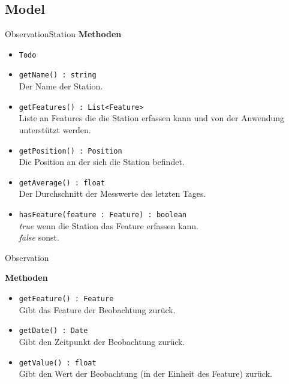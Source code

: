 \subsection{Model}

    \begin{Class}{ObservationStation}
        \textbf{Methoden}
        \begin{itemize}
            \item \texttt{Todo}
            \item \texttt{getName() : string}
            \\ Der Name der Station.
            \item \texttt{getFeatures() : List<Feature>}
            \\ Liste an Features die die Station erfassen kann und von der Anwendung unterstützt werden.
            \item \texttt{getPosition() : Position}
            \\ Die Position an der sich die Station befindet.
            \item \texttt{getAverage() : float}
            \\ Der Durchschnitt der Messwerte des letzten Tages.
            \item \texttt{hasFeature(feature : Feature) : boolean}
            \\ \emph{true} wenn die Station das Feature erfassen kann.
            \\ \emph{false} sonst.
        \end{itemize}
    \end{Class}

    \begin{Class}{Observation}
        
        \textbf{Methoden}
        \begin{itemize}
            \item \texttt{getFeature() : Feature}
            \\ Gibt das Feature der Beobachtung zurück.
            \item \texttt{getDate() : Date}
            \\ Gibt den Zeitpunkt der Beobachtung zurück.
            \item \texttt{getValue() : float}
            \\ Gibt den Wert der Beobachtung (in der Einheit des Feature) zurück.
        \end{itemize}
    \end{Class}

